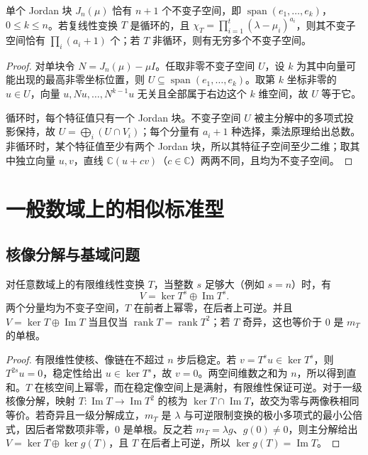 \begin{proposition}
\label{prop:xie-ex-sim-invariant-count-complex}
单个 Jordan 块 $J_n(\mu)$ 恰有 $n+1$ 个不变子空间，即 $\operatorname{span}(e_1,\ldots,e_k)$，$0\leq k\leq n$。若复线性变换 $T$ 是循环的，且 $\chi_T=\prod_{i=1}^{t}(\lambda-\mu_i)^{a_i}$，则其不变子空间恰有 $\prod_i(a_i+1)$ 个；若 $T$ 非循环，则有无穷多个不变子空间。
\end{proposition}
\begin{proof}
对单块令 $N=J_n(\mu)-\mu I$。任取非零不变子空间 $U$，设 $k$ 为其中向量可能出现的最高非零坐标位置，则 $U\subseteq\operatorname{span}(e_1,\ldots,e_k)$。取第 $k$ 坐标非零的 $u\in U$，向量 $u,Nu,\ldots,N^{k-1}u$ 无关且全部属于右边这个 $k$ 维空间，故 $U$ 等于它。

循环时，每个特征值只有一个 Jordan 块。不变子空间 $U$ 被主分解中的多项式投影保持，故 $U=\bigoplus_i(U\cap V_i)$；每个分量有 $a_i+1$ 种选择，乘法原理给出总数。非循环时，某个特征值至少有两个 Jordan 块，所以其特征子空间至少二维；取其中独立向量 $u,v$，直线 $\mathbb C(u+cv)$（$c\in\mathbb C$）两两不同，且均为不变子空间。
\end{proof}

\section{一般数域上的相似标准型}
\label{sec:xie-ex-sim-general-field}

\subsection{核像分解与基域问题}

\begin{proposition}[Fitting 分解]
\label{prop:xie-ex-sim-fitting}
对任意数域上的有限维线性变换 $T$，当整数 $s$ 足够大（例如 $s=n$）时，有
\[
 V=\ker T^s\oplus\operatorname{Im}T^s.
\]
两个分量均为不变子空间，$T$ 在前者上幂零，在后者上可逆。并且 $V=\ker T\oplus\operatorname{Im}T$ 当且仅当 $\operatorname{rank}T=\operatorname{rank}T^2$；若 $T$ 奇异，这也等价于 $0$ 是 $m_T$ 的单根。
\end{proposition}
\begin{proof}
有限维性使核、像链在不超过 $n$ 步后稳定。若 $v=T^su\in\ker T^s$，则 $T^{2s}u=0$，稳定性给出 $u\in\ker T^s$，故 $v=0$。两空间维数之和为 $n$，所以得到直和。$T$ 在核空间上幂零，而在稳定像空间上是满射，有限维性保证可逆。对于一级核像分解，映射 $T:\operatorname{Im}T\to\operatorname{Im}T^2$ 的核为 $\ker T\cap\operatorname{Im}T$，故交为零与两像秩相同等价。若奇异且一级分解成立，$m_T$ 是 $\lambda$ 与可逆限制变换的极小多项式的最小公倍式，因后者常数项非零，$0$ 是单根。反之若 $m_T=\lambda g$、$g(0)\ne0$，则主分解给出 $V=\ker T\oplus\ker g(T)$，且 $T$ 在后者上可逆，所以 $\ker g(T)=\operatorname{Im}T$。
\end{proof}

